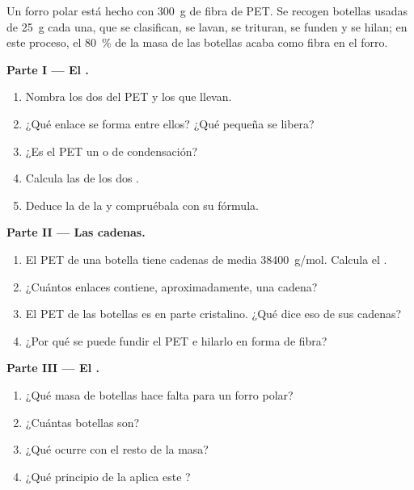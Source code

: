 \begin{problem}
\label{pb:g12:polymers:1}
Un forro polar está hecho con \qty{300}{g} de fibra de PET. Se recogen
botellas usadas de \qty{25}{g} cada una, que se clasifican, se lavan, se
trituran, se funden y se hilan; en este proceso, el \qty{80}{\percent} de
la masa de las botellas acaba como fibra en el forro.

\medskip
\noindent\textbf{Parte I --- El .}
\begin{enumerate}
  \item Nombra los dos  del PET y los  que
        llevan.
  \item ¿Qué enlace se forma entre ellos? ¿Qué  pequeña se
        libera?
  \item ¿Es el PET un  o de condensación?
  \item Calcula las  de los dos .
  \item Deduce la  de la   y
        compruébala con su fórmula.
\end{enumerate}

\medskip
\noindent\textbf{Parte II --- Las cadenas.}
\begin{enumerate}[resume]
  \item El PET de una botella tiene cadenas de  media
        \qty{38400}{g/mol}. Calcula el .
  \item ¿Cuántos enlaces  contiene, aproximadamente, una cadena?
  \item El PET de las botellas es en parte cristalino. ¿Qué dice eso de
        sus cadenas?
  \item ¿Por qué se puede fundir el PET e hilarlo en forma de fibra?
\end{enumerate}

\medskip
\noindent\textbf{Parte III --- El .}
\begin{enumerate}[resume]
  \item ¿Qué masa de botellas hace falta para un forro polar?
  \item ¿Cuántas botellas son?
  \item ¿Qué ocurre con el resto de la masa?
  \item ¿Qué principio de la  aplica este ?
\end{enumerate}


\end{problem}

